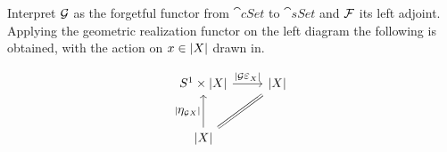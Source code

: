 \documentclass[../../main.tex]{subfiles}
\begin{document}
    Interpret $\functor{G}$ as the forgetful functor from $\cat{cSet}$ to $\cat{sSet}$ and $\functor{F}$ its left adjoint. Applying the geometric realization functor on the left diagram the following is obtained, with the action on $x \in \geom[X]$ drawn in.

    \begin{figure}[H]
        \[
            \begin{tikzcd}[row sep = large]
                S^1 \times \geom[X] \arrow[r,"|\functor{G} \mathlarger{\varepsilon}_X|"] & \geom[X] \\
                \geom[X] \arrow[u,"|\mathlarger{\eta}_{\functor{G}X}|"] \arrow[ur, equal]
            \end{tikzcd}
        \]
    \end{figure}
\end{document}
